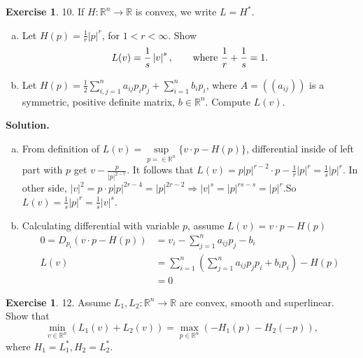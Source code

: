 \documentclass[a4paper]{book}
\newenvironment{solution}%
{\noindent\textbf{Solution.}}%
{\qedhere}
\numberwithin{equation}{chapter}
\theoremstyle{definition}
\newtheorem{exc}[exm]{Exercise}
\begin{document}
\begin{exc}
  10.  If $H : \mathbb{R}^n \rightarrow \mathbb{R}$ is convex, we write $L = H^*$.
  \begin{enumerate} [(a)]
  \item Let $H(p) = \frac{1}{r} \left| p \right|^r$, for $1 < r < \infty$. Show
    \[L(v) = \frac{1}{s} \left| v \right|^s, \qquad \textmd{where } \frac{1}{r} + \frac{1}{s} = 1.\]

  \item Let $H(p) = \frac{1}{2} \sum_{i,j=1}^n a_{ij} p_i p_j + \sum_{i = 1}^n b_i p_i$, where $A = ((a_{ij}))$ is a symmetric, positive definite matrix, $b \in \mathbb{R}^n$. Compute $L(v)$.
    
  \end{enumerate}
\end{exc}

\begin{solution}
  \begin{enumerate}[(a)]
  \item  From definition of $L(v) = \sup\limits_{p = \in \mathbb{R}^n}\{v \cdot p - H(p)\}$, differential inside of left part with $p$ get $v - \frac{p}{\left| p \right|^{2 - r}}$. It follows that $L(v) = p \left| p \right|^{r - 2} \cdot p - \frac{1}{r}\left| p \right|^r = \frac{1}{s} \left| p \right|^r $. In other side, $\left| v \right|^2 = p \cdot p \left| p \right|^{2r - 4} = \left| p \right|^{2r - 2} \Longrightarrow \left| v \right|^s = \left| p \right|^{rs - s} = \left| p \right|^r$.So $L(v) = \frac{1}{s}\left| p \right|^r = \frac{1}{s}\left| v \right|^s$.
  \item Calculating differential with variable $p$, assume $L(v) = v\cdot p - H(p)$
    \begin{equation*}
      \begin{aligned}
        0 = D_{p_i}(v \cdot p - H(p)) &= v_i - \sum_{j = 1}^n a_{ij} p_j - b_i \\
        L(v) &=  \sum_{i = 1}^n(\sum_{j = 1}^n a_{ij} p_j p_i  + b_i p_i) - H(p) \\
        &= 0
      \end{aligned}
    \end{equation*}
    \end{enumerate}
\end{solution}




\begin{exc}
  12.   Assume $L_1, L_2: \mathbb{R}^n \rightarrow \mathbb{R}$ are convex, smooth and superlinear. Show that
  \[\min\limits_{v \in \mathbb{R}^n}(L_1(v) + L_2(v)) = \max\limits_{p \in \mathbb{R}^n}(-H_1(p)-H_2(-p)),\]
  where $H_1 = L_1^*, H_2 = L_2^*$.
\end{exc}
\end{document}
